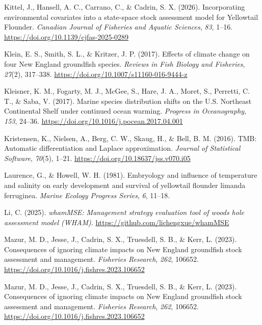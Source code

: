\documentclass[
  12pt,
]{article}
\newlength{\cslhangindent}
\newenvironment{CSLReferences}[2] %
 {\begin{list}{}{%
  \setlength{\itemindent}{0pt}
  \setlength{\leftmargin}{0pt}
  \setlength{\parsep}{0pt}
  \ifodd #1
   \setlength{\leftmargin}{\cslhangindent}
   \setlength{\itemindent}{-1\cslhangindent}
  \fi
  \setlength{\itemsep}{#2\baselineskip}}}
 {\end{list}}
\begin{document}
\begin{CSLReferences}{1}{2}
Kittel, J., Hansell, A. C., Carrano, C., \& Cadrin, S. X. (2026). Incorporating environmental covariates into a state-space stock assessment model for {Yellowtail Flounder}. \emph{Canadian Journal of Fisheries and Aquatic Sciences}, \emph{83}, 1--16. \url{https://doi.org/10.1139/cjfas-2025-0289}

Klein, E. S., Smith, S. L., \& Kritzer, J. P. (2017). Effects of climate change on four New England groundfish species. \emph{Reviews in Fish Biology and Fisheries}, \emph{27}(2), 317--338. \url{https://doi.org/10.1007/s11160-016-9444-z}

Kleisner, K. M., Fogarty, M. J., McGee, S., Hare, J. A., Moret, S., Perretti, C. T., \& Saba, V. (2017). Marine species distribution shifts on the U.S. Northeast Continental Shelf under continued ocean warming. \emph{Progress in Oceanography}, \emph{153}, 24--36. \url{https://doi.org/10.1016/j.pocean.2017.04.001}

Kristensen, K., Nielsen, A., Berg, C. W., Skaug, H., \& Bell, B. M. (2016). {TMB}: Automatic differentiation and {L}aplace approximation. \emph{Journal of Statistical Software}, \emph{70}(5), 1--21. \url{https://doi.org/10.18637/jss.v070.i05}

Laurence, G., \& Howell, W. H. (1981). Embryology and influence of temperature and salinity on early development and survival of yellowtail flounder limanda ferruginea. \emph{Marine Ecology Progress Series}, \emph{6}, 11--18.

Li, C. (2025). \emph{whamMSE: Management strategy evaluation tool of woods hole assessment model (WHAM)}. \url{https://github.com/lichengxue/whamMSE}

Mazur, M. D., Jesse, J., Cadrin, S. X., Truesdell, S. B., \& Kerr, L. (2023). Consequences of ignoring climate impacts on New England groundfish stock assessment and management. \emph{Fisheries Research}, \emph{262}, 106652. \url{https://doi.org/10.1016/j.fishres.2023.106652}

Mazur, M. D., Jesse, J., Cadrin, S. X., Truesdell, S. B., \& Kerr, L. (2023). Consequences of ignoring climate impacts on {New England} groundfish stock assessment and management. \emph{Fisheries Research}, \emph{262}, 106652. \url{https://doi.org/10.1016/j.fishres.2023.106652}


\end{CSLReferences}
\end{document}
